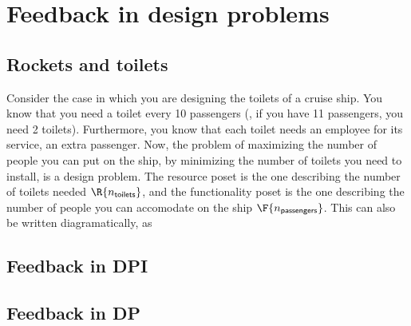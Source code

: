 

\section{Feedback in design problems}
\label{sec:feedbackindesign}

\subsection{Rockets and toilets}

Consider the case in which you are designing the toilets of a cruise ship. You know that you need a toilet every 10 passengers (\ie , if you have 11 passengers, you need 2 toilets). Furthermore, you know that each toilet needs an employee for its service, \ie an extra passenger. Now, the problem of maximizing the number of people you can put on the ship, by minimizing the number of toilets you need to install, is a design problem. The resource poset is the one describing the number of toilets needed $\R{n_\mathsf{toilets}}$, and the functionality poset is the one describing the number of people you can accomodate on the ship $\F{n_\mathsf{passengers}}$.
This can also be written diagramatically, as
\begin{center}
\end{center}

\subsection{Feedback in DPI}


\subsection{Feedback in DP}

